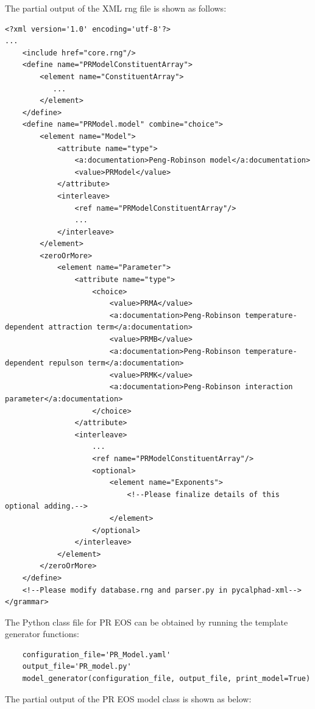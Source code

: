 The partial output of the XML rng file is shown as follows:
\begin{verbatim}
<?xml version='1.0' encoding='utf-8'?>
...
    <include href="core.rng"/>
    <define name="PRModelConstituentArray">
        <element name="ConstituentArray">
           ...
        </element>
    </define>
    <define name="PRModel.model" combine="choice">
        <element name="Model">
            <attribute name="type">
                <a:documentation>Peng-Robinson model</a:documentation>
                <value>PRModel</value>
            </attribute>
            <interleave>
                <ref name="PRModelConstituentArray"/>
                ...
            </interleave>
        </element>
        <zeroOrMore>
            <element name="Parameter">
                <attribute name="type">
                    <choice>
                        <value>PRMA</value>
                        <a:documentation>Peng-Robinson temperature-dependent attraction term</a:documentation>
                        <value>PRMB</value>
                        <a:documentation>Peng-Robinson temperature-dependent repulson term</a:documentation>
                        <value>PRMK</value>
                        <a:documentation>Peng-Robinson interaction parameter</a:documentation>
                    </choice>
                </attribute>
                <interleave>
                    ...
                    <ref name="PRModelConstituentArray"/>
                    <optional>
                        <element name="Exponents">
                            <!--Please finalize details of this optional adding.-->
                        </element>
                    </optional>
                </interleave>
            </element>
        </zeroOrMore>
    </define>
    <!--Please modify database.rng and parser.py in pycalphad-xml-->
</grammar>
\end{verbatim}
The Python class file for PR EOS can be obtained by running the template generator functions:
\begin{verbatim}
    configuration_file='PR_Model.yaml'
    output_file='PR_model.py'
    model_generator(configuration_file, output_file, print_model=True)
\end{verbatim}
The partial output of the PR EOS model class is shown as below:
